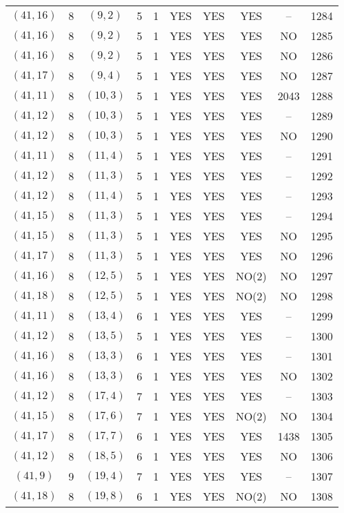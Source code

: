 \begin{longtable}{|c|c|c|c|c|c|c|c|c|c|}
$(41, 16)$ & 8 & $(9, 2)$ & 5 & 1 & YES & YES & YES & -- & 1284\\
$(41, 16)$ & 8 & $(9, 2)$ & 5 & 1 & YES & YES & YES & NO & 1285\\
$(41, 16)$ & 8 & $(9, 2)$ & 5 & 1 & YES & YES & YES & NO & 1286\\
$(41, 17)$ & 8 & $(9, 4)$ & 5 & 1 & YES & YES & YES & NO & 1287\\
$(41, 11)$ & 8 & $(10, 3)$ & 5 & 1 & YES & YES & YES & 2043 & 1288\\
$(41, 12)$ & 8 & $(10, 3)$ & 5 & 1 & YES & YES & YES & -- & 1289\\
$(41, 12)$ & 8 & $(10, 3)$ & 5 & 1 & YES & YES & YES & NO & 1290\\
$(41, 11)$ & 8 & $(11, 4)$ & 5 & 1 & YES & YES & YES & -- & 1291\\
$(41, 12)$ & 8 & $(11, 3)$ & 5 & 1 & YES & YES & YES & -- & 1292\\
$(41, 12)$ & 8 & $(11, 4)$ & 5 & 1 & YES & YES & YES & -- & 1293\\
$(41, 15)$ & 8 & $(11, 3)$ & 5 & 1 & YES & YES & YES & -- & 1294\\
$(41, 15)$ & 8 & $(11, 3)$ & 5 & 1 & YES & YES & YES & NO & 1295\\
$(41, 17)$ & 8 & $(11, 3)$ & 5 & 1 & YES & YES & YES & NO & 1296\\
$(41, 16)$ & 8 & $(12, 5)$ & 5 & 1 & YES & YES & NO(2) & NO & 1297\\
$(41, 18)$ & 8 & $(12, 5)$ & 5 & 1 & YES & YES & NO(2) & NO & 1298\\
$(41, 11)$ & 8 & $(13, 4)$ & 6 & 1 & YES & YES & YES & -- & 1299\\
$(41, 12)$ & 8 & $(13, 5)$ & 5 & 1 & YES & YES & YES & -- & 1300\\
$(41, 16)$ & 8 & $(13, 3)$ & 6 & 1 & YES & YES & YES & -- & 1301\\
$(41, 16)$ & 8 & $(13, 3)$ & 6 & 1 & YES & YES & YES & NO & 1302\\
$(41, 12)$ & 8 & $(17, 4)$ & 7 & 1 & YES & YES & YES & -- & 1303\\
$(41, 15)$ & 8 & $(17, 6)$ & 7 & 1 & YES & YES & NO(2) & NO & 1304\\
$(41, 17)$ & 8 & $(17, 7)$ & 6 & 1 & YES & YES & YES & 1438 & 1305\\
$(41, 12)$ & 8 & $(18, 5)$ & 6 & 1 & YES & YES & YES & NO & 1306\\
$(41, 9)$ & 9 & $(19, 4)$ & 7 & 1 & YES & YES & YES & -- & 1307\\
$(41, 18)$ & 8 & $(19, 8)$ & 6 & 1 & YES & YES & NO(2) & NO & 1308\\

\end{longtable}
